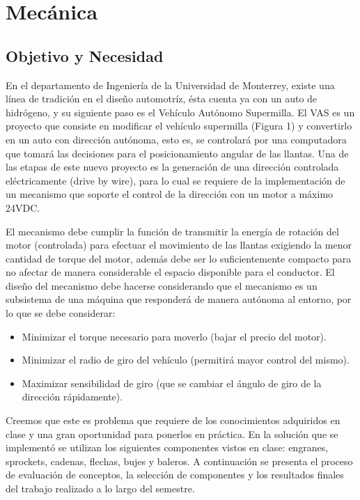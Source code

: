 \chapter{Mecánica}

\section{Objetivo y Necesidad}

En el departamento de Ingeniería de la Universidad de Monterrey, existe una línea de tradición en el diseño automotríz, ésta cuenta ya con un auto de hidrógeno, y su siguiente paso es el Vehículo Autónomo Supermilla. El VAS es un proyecto que consiste en modificar el vehículo supermilla (Figura 1) y convertirlo en un auto con dirección autónoma, esto es, se controlará por una computadora que tomará las decisiones para el posicionamiento angular de las llantas. Una de las etapas de este nuevo proyecto es la generación de una dirección controlada eléctricamente (drive by wire), para lo cual se requiere de la implementación de un mecanismo que soporte el control de la dirección con un motor a máximo 24VDC.



El mecanismo debe cumplir la función de transmitir la energía de rotación del motor (controlada) para efectuar el movimiento de las llantas exigiendo la menor cantidad de torque del motor, además debe ser lo suficientemente compacto para no afectar de manera considerable el espacio disponible para el conductor. El diseño del mecanismo debe hacerse considerando que el mecanismo es un subsistema de una máquina que responderá de manera autónoma al entorno, por lo que se debe considerar:

\begin{itemize}
\item Minimizar el torque necesario para moverlo (bajar el precio del motor).
\item Minimizar el radio de giro del vehículo (permitirá mayor control del mismo).
\item Maximizar sensibilidad de giro (que se cambiar el ángulo de giro de la dirección rápidamente).
\end{itemize}

Creemos que este es problema que requiere de los conocimientos adquiridos en clase y una gran oportunidad para ponerlos en práctica. En la solución que se implementó se utilizan los siguientes componentes vistos en clase: engranes, sprockets, cadenas, flechas, bujes y baleros. A continuación se presenta el proceso de evaluación de conceptos, la selección de componentes y los resultados finales del trabajo realizado a lo largo del semestre.

